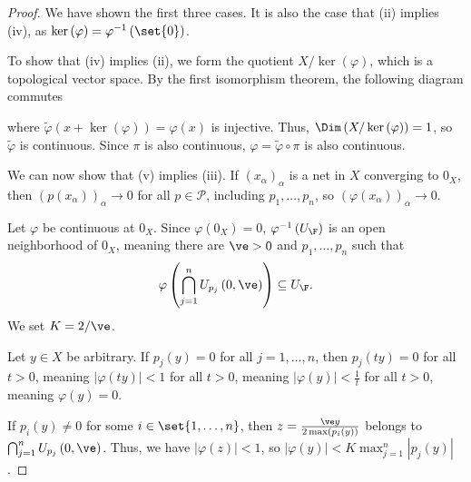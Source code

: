 \documentclass[10pt]{mypackage}
\begin{document}
\begin{proof}
  We have shown the first three cases. It is also the case that (ii) implies (iv), as $\ker\left(\varphi\right) = \varphi^{-1}\left(\set{0}\right)$.\newline

  To show that (iv) implies (ii), we form the quotient $X/\ker\left(\varphi\right)$, which is a topological vector space. By the first isomorphism theorem, the following diagram commutes
  \begin{center}
  \end{center}
  where $\widetilde{\varphi}\left(x + \ker\left(\varphi\right)\right) = \varphi(x)$ is injective. Thus, $\Dim\left(X/\ker\left(\varphi\right)\right) = 1$, so $\widetilde{\varphi}$ is continuous. Since $\pi$ is also continuous, $\varphi = \widetilde{\varphi}\circ \pi$ is also continuous.\newline

  We can now show that (v) implies (iii). If $\left(x_{\alpha}\right)_{\alpha}$ is a net in $X$ converging to $0_X$, then $\left(p\left(x_{\alpha}\right)\right)_{\alpha}\rightarrow 0$ for all $p\in \mathcal{P}$, including $p_1,\dots,p_n$, so $\left(\varphi\left(x_{\alpha}\right)\right)_{\alpha}\rightarrow 0$.\newline

  Let $\varphi$ be continuous at $0_X$. Since $\varphi\left(0_X\right) = 0$, $\varphi^{-1}\left(U_{\F}\right)$ is an open neighborhood of $0_X$, meaning there are $\ve > 0$ and $p_1,\dots,p_n$ such that
  \begin{align*}
    \varphi\left(\bigcap_{j=1}^{n}U_{p_j}\left(0,\ve\right)\right) \subseteq U_{\F}.
  \end{align*}
  We set $K = 2/\ve$.\newline

  Let $y\in X$ be arbitrary. If $p_j\left(y\right) = 0$ for all $j=1,\dots,n$, then $p_j\left(ty\right) = 0$ for all $t > 0$, meaning $\left\vert \varphi\left(ty\right) \right\vert < 1$ for all $t > 0$, meaning $\left\vert \varphi\left(y\right) \right\vert < \frac{1}{t}$ for all $t > 0$, meaning $\varphi\left(y\right) = 0$.\newline

  If $p_i\left(y\right) \neq 0$ for some $i\in \set{1,\dots,n}$, then $z = \frac{\ve y}{2\max\left(p_i\left(y\right)\right)}$ belongs to $\bigcap_{j=1}^{n}U_{p_j}\left(0,\ve\right)$. Thus, we have $\left\vert \varphi\left(z\right) \right\vert < 1$, so $\left\vert \varphi\left(y\right) \right\vert < K\max_{j=1}^{n}\left\vert p_j\left(y\right) \right\vert$.
\end{proof}
\end{document}
